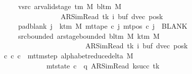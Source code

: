 \begin{isabellebody}
\ \ \ \ \ \ \ vsrc{\isacharcolon}{\kern0pt}\ {\isachardoublequoteopen}ar{\isacharunderscore}{\kern0pt}valid{\isacharunderscore}{\kern0pt}stage\ {\isacharparenleft}{\kern0pt}{\isasymGamma}{\isacharunderscore}{\kern0pt}tm\ M{\isacharparenright}{\kern0pt}\ {\isacharparenleft}{\kern0pt}bl{\isacharunderscore}{\kern0pt}tm\ M{\isacharparenright}{\kern0pt}\isanewline
\ \ \ \ \ \ \ \ \ \ \ \ \ \ \ \ \ \ \ {\isacharparenleft}{\kern0pt}AR{\isacharunderscore}{\kern0pt}SimRead{\isacharcomma}{\kern0pt}\ tk{\isacharcomma}{\kern0pt}\ i{\isacharcomma}{\kern0pt}\ buf{\isacharcomma}{\kern0pt}\ dvec{\isacharcomma}{\kern0pt}\ posk{\isacharparenright}{\kern0pt}{\isachardoublequoteclose}\isanewline
\ \ \ \ \ \ \ pad{\isacharunderscore}{\kern0pt}blank{\isacharcolon}{\kern0pt}\ {\isachardoublequoteopen}{\isasymforall}j\ {\isasymge}\ k{\isacharunderscore}{\kern0pt}tm\ M{\isachardot}{\kern0pt}\ mt{\isacharunderscore}{\kern0pt}tape\ c{\isacharprime}{\kern0pt}\ j\ {\isacharparenleft}{\kern0pt}mt{\isacharunderscore}{\kern0pt}pos\ c{\isacharprime}{\kern0pt}\ j{\isacharparenright}{\kern0pt}\ {\isacharequal}{\kern0pt}\ BLANK{}{\isachardoublequoteclose}\isanewline
\ \ \ \ \ \ \ src{\isacharunderscore}{\kern0pt}bounded{\isacharcolon}{\kern0pt}\ {\isachardoublequoteopen}ar{\isacharunderscore}{\kern0pt}stage{\isacharunderscore}{\kern0pt}bounded\ {\isacharparenleft}{\kern0pt}bl{\isacharunderscore}{\kern0pt}tm\ M{\isacharparenright}{\kern0pt}\ {\isacharparenleft}{\kern0pt}k{\isacharunderscore}{\kern0pt}tm\ M{\isacharparenright}{\kern0pt}\isanewline
\ \ \ \ \ \ \ \ \ \ \ \ \ \ \ \ \ \ \ \ \ \ \ \ \ \ {\isacharparenleft}{\kern0pt}AR{\isacharunderscore}{\kern0pt}SimRead{\isacharcomma}{\kern0pt}\ tk{\isacharcomma}{\kern0pt}\ i{\isacharcomma}{\kern0pt}\ buf{\isacharcomma}{\kern0pt}\ dvec{\isacharcomma}{\kern0pt}\ posk{\isacharparenright}{\kern0pt}{\isachardoublequoteclose}\isanewline
\ \ \ {\isachardoublequoteopen}{\isasymexists}c{\isacharprime}{\kern0pt}{\isacharprime}{\kern0pt}{\isachardot}{\kern0pt}\ {\isacharparenleft}{\kern0pt}c{\isacharprime}{\kern0pt}{\isacharcomma}{\kern0pt}\ c{\isacharprime}{\kern0pt}{\isacharprime}{\kern0pt}{\isacharparenright}{\kern0pt}\ {\isasymin}\ mttm{\isacharunderscore}{\kern0pt}step\ {\isacharparenleft}{\kern0pt}alphabet{\isacharunderscore}{\kern0pt}reduce{\isacharunderscore}{\kern0pt}delta\ M{\isacharparenright}{\kern0pt}\isanewline
\ \ \ \ \ \ \ \ \ \ \ \ \ \ {\isasymand}\ mt{\isacharunderscore}{\kern0pt}state\ c{\isacharprime}{\kern0pt}{\isacharprime}{\kern0pt}\ {\isacharequal}{\kern0pt}\ {\isacharparenleft}{\kern0pt}q{\isacharcomma}{\kern0pt}\ AR{\isacharunderscore}{\kern0pt}SimRead{\isacharcomma}{\kern0pt}\ k{\isacharunderscore}{\kern0pt}succ\ tk{\isacharcomma}{\kern0pt}\ {}{\isacharcomma}{\kern0pt}\isanewline

\end{isabellebody}
